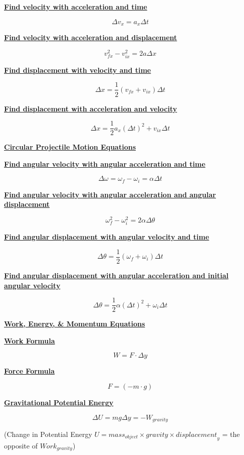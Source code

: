 \documentclass[12pt, letterpaper]{article}
\begin{document}
\normalsize{\centerline{\textbf{\underline{Find velocity with acceleration and time}}}}
\[\Delta v_x = a_x \Delta t\]

\centerline{\textbf{\underline{Find velocity with acceleration and displacement}}}
\[v^2_{fx} - v^2_{ix} = 2a \Delta x\]

\centerline{\textbf{\underline{Find displacement with velocity and time}}}
\[\Delta x = \frac{1}{2} (v_{fx} + v_{ix}) \Delta t\]

\centerline{\textbf{\underline{Find displacement with acceleration and velocity}}}
\[\Delta x = \frac{1}{2} a_x (\Delta t)^2 + v_{ix} \Delta t\]

\newpage

\Large{\centerline{\textbf{\underline{Circular Projectile Motion Equations}}}}
\vspace{1em}

\normalsize{\centerline{\textbf{\underline{Find angular velocity with angular acceleration and time}}}}
\[\Delta \omega = \omega_f - \omega_i = \alpha \Delta t\]

\centerline{\textbf{\underline{Find angular velocity with angular acceleration and angular displacement}}}
\[\omega^2_{f} - \omega^2_{i} = 2 \alpha \Delta \theta \]

\centerline{\textbf{\underline{Find angular displacement with angular velocity and time}}}
\[\Delta \theta = \frac{1}{2} (\omega_{f} + \omega_{i}) \Delta t\]

\centerline{\textbf{\underline{Find angular displacement with angular acceleration and initial angular velocity}}}
\[\Delta \theta = \frac{1}{2} \alpha (\Delta t)^2 + \omega_{i} \Delta t\]

\newpage


\Large{\centerline{\textbf{\underline{Work, Energy, \& Momentum Equations}}}}
\vspace{1em}

\normalsize{\centerline{\textbf{\underline{Work Formula}}}}
\[W = F \cdot \Delta y\]

\normalsize{\centerline{\textbf{\underline{Force Formula}}}}
\[F = (-m \cdot g)\]

\normalsize{\centerline{\textbf{\underline{Gravitational Potential Energy}}}}
\[\Delta U = mg \Delta y = -W_{gravity}\]
\small{\centerline{(Change in Potential Energy $U = {mass}_{object} \times {gravity} \times {displacement}_y$ = the opposite of ${Work}_{gravity}$)}}
\end{document}
